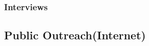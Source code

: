 \documentclass[12pt,english]{scrartcl}
\begin{document}
\subsubsection{Interviews}



\begin{comment}

\raggedright\vspace{2mm}\textbf{Activity}
\begin{itemize}
\item Presentations \cite{moore2018building2,blas2018protecting,deloso2018parasitoid,moore2018freecell,moore2018coconut,moore2018biological2,moore2018freecell2,marshall2018progress,moore2018attempted,moore2017impactof,moore2018biological,moore2018building,moore2017invasion,moore2017coconut,moore2017usingfree,moore2017accessto,moore2017biological,moore2017thecoconut,moore2017biological2,moore2017biological3}
\item Workshops \cite{berringer2018sixteenth,moore2017bringyour,moore2018cnasworkshop,quitugua20182018coconut}
\item Press \cite{moore2018special,varietyuogseeks,pacific2018scientists,2018viralcontrol,postnewtree,leonguerrero2018interview,2018g2ghuman,2017tracking}
\end{itemize}
\raggedright\vspace{2mm}\textbf{Reference(s)}

\begin{btSect}[vancouver]{zotero}
\btPrintCited
\end{btSect}
\newpage{}
\end{btUnit}

\begin{btUnit}

\end{comment}

\subsection{Public Outreach(Internet)}
\end{document}
